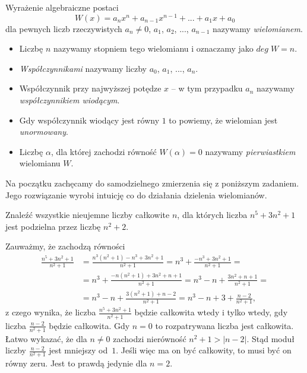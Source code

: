 


\noindent
Wyrażenie algebraiczne postaci
\[
    W(x) = a_nx^n + a_{n - 1}x^{n - 1} + ... + a_1x + a_0
\]
dla pewnych liczb rzeczywistych $a_n \neq 0$, $a_1$, $a_2$, ..., $a_{n - 1}$ nazywamy \textit{wielomianem}.
\begin{itemize}
    \item Liczbę $n$ nazywamy stopniem tego wielomianu i oznaczamy jako $deg \; W = n$.

    \item \textit{Współczynnikami} nazywamy liczby $a_0$, $a_1$, ..., $a_n$.

    \item Współczynnik przy najwyższej potędze $x$ -- w tym przypadku $a_n$ nazywamy \textit{współczynnikiem wiodącym}.

    \item Gdy współczynnik wiodący jest równy $1$ to powiemy, że wielomian jest \textit{unormowany}.

    \item Liczbę $\alpha$, dla której zachodzi równość $W(\alpha) = 0$ nazywamy \textit{pierwiastkiem} wielomianu $W$.
\end{itemize}

\vspace{5px}

\noindent 
Na początku zachęcamy do samodzielnego zmierzenia się z poniższym zadaniem. Jego rozwiązanie wyrobi intuicję co do działania dzielenia wielomianów.

\vspace{5px}


\noindent
Znaleźć wszystkie nieujemne liczby całkowite $n$, dla których liczba $n^5 + 3n^2 + 1$ jest podzielna przez liczbę $n^2 + 2$.

\vspace{5px}


\noindent
Zauważmy, że zachodzą równości
\begin{align*}
    \frac{n^5 + 3n^2 + 1}{n^2 + 1} &= 
    \frac{n^3(n^2 + 1) - n^3 + 3n^2 + 1}{n^2 + 1} 
    = n^3 + \frac{- n^3 + 3n^2 + 1}{n^2 + 1} = \\
    &= n^3 + \frac{-n(n^2 + 1) + 3n^2 + n + 1}{n^2 + 1} 
    = n^3 - n + \frac{3n^2 + n + 1}{n^2 + 1} = \\
    &= n^3 - n + \frac{3(n^2 + 1) + n - 2}{n^2 + 1}
    =  n^3 - n + 3 + \frac{n - 2}{n^2 + 1}, 
\end{align*} 
z czego wynika, że liczba $\frac{n^5 + 3n^2 + 1}{n^2 + 1}$ będzie całkowita wtedy i tylko wtedy, gdy liczba $\frac{n - 2}{n^2 + 1}$ będzie całkowita. Gdy $n = 0$ to rozpatrywana liczba jest całkowita. Łatwo wykazać, że dla $n \neq 0$ zachodzi nierówność $n^2 + 1 > |n - 2|$. Stąd moduł liczby $\frac{n - 2}{n^2 + 1}$ jest mniejszy od~$1$. Jeśli więc ma on być całkowity, to musi być on równy zeru. Jest to prawdą jedynie dla $n = 2$.

